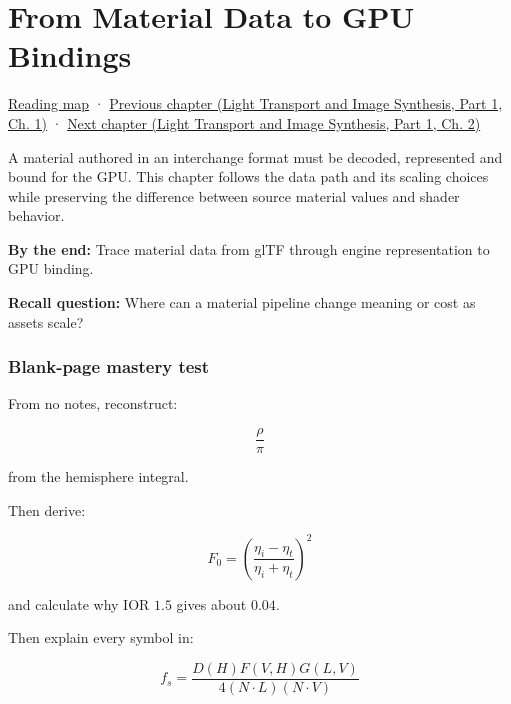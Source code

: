 \chapter{From Material Data to GPU Bindings}\label{03-visual-computing-i-ch006-from-material-data-to-gpu-bindings}\hypertarget{03-visual-computing-i-ch006}{}\label{stagechapter:03-visual-computing-i-ch006}

\hypertarget{03-visual-computing-i-ch006-from-material-data-to-gpu-bindings}{}

\hyperref[volume-reading-map]{Reading map} · \href{../04-Light-Transport-and-Image-Synthesis-P01/main.pdf\#nameddest=03-visual-computing-i-ch005-reflectance-materials-and-light-transport}{Previous chapter (Light Transport and Image Synthesis, Part 1, Ch. 1)} · \href{../04-Light-Transport-and-Image-Synthesis-P01/main.pdf\#nameddest=03-visual-computing-i-ch007-the-rendering-equation-and-path-probabilities}{Next chapter (Light Transport and Image Synthesis, Part 1, Ch. 2)}

A material authored in an interchange format must be decoded, represented and bound for the GPU. This chapter follows the data path and its scaling choices while preserving the difference between source material values and shader behavior.

\textbf{By the end:} Trace material data from glTF through engine representation to GPU binding.

\textbf{Recall question:} Where can a material pipeline change meaning or cost as assets scale?

\subsection{Blank-page mastery test}\label{03-visual-computing-i-ch006-blank-page-mastery-test}

\hypertarget{03-visual-computing-i-ch006-blank-page-mastery-test}{}

From no notes, reconstruct:

\[
\frac{\rho}{\pi}
\]

from the hemisphere integral.

Then derive:

\[
F_0=
\left(
\frac{\eta_i-\eta_t}
{\eta_i+\eta_t}
\right)^2
\]

and calculate why IOR \(1.5\) gives about \(0.04\).

Then explain every symbol in:

\[
\boxed{
f_s=
\frac{
D(H)F(V,H)G(L,V)
}{
4(N\cdot L)(N\cdot V)
}
}
\]

